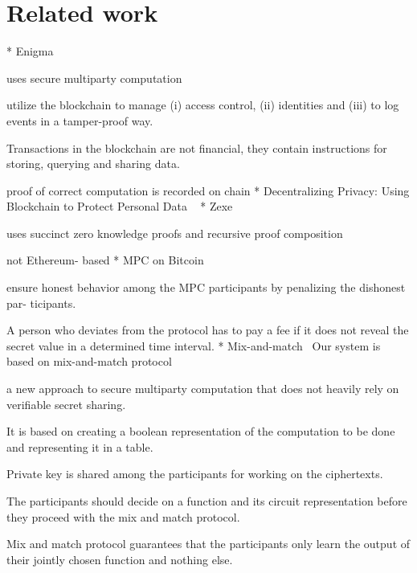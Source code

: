\section{Related work}
* Enigma~\cite{zyskind2015enigma}

uses secure multiparty computation

utilize the blockchain to manage (i) access control, (ii) identities and (iii) to log events in a tamper-proof way.

Transactions in the blockchain are not financial, they contain instructions for storing, querying and sharing data.

proof of correct computation is recorded on chain
\newline
\newline
* Decentralizing Privacy: Using Blockchain to Protect Personal Data ~\cite{zyskind2015decentralizing}
\newline
\newline
* Zexe~\cite{bowe2020zexe}

uses succinct zero knowledge proofs and recursive proof composition

not Ethereum- based
\newline
\newline
* MPC on Bitcoin~\cite{andrychowicz2014secure}

ensure honest behavior among the MPC participants by penalizing the dishonest par- ticipants.

A person who deviates from the protocol has to pay a fee if it does not reveal the secret value in a determined time interval. 
\newline
\newline
* Mix-and-match~\cite{jakobsson2000mix}
Our system is based on mix-and-match protocol

a new approach to secure multiparty computation that does not heavily rely on verifiable secret sharing. 

It is based on creating a boolean representation of the computation to be done and representing it in a table. 

Private key is shared among the participants for working on the ciphertexts. 

The participants should decide on a function and its circuit representation before they proceed with the mix and match protocol.

Mix and match protocol guarantees that the participants only learn the output of their jointly chosen function and nothing else.

